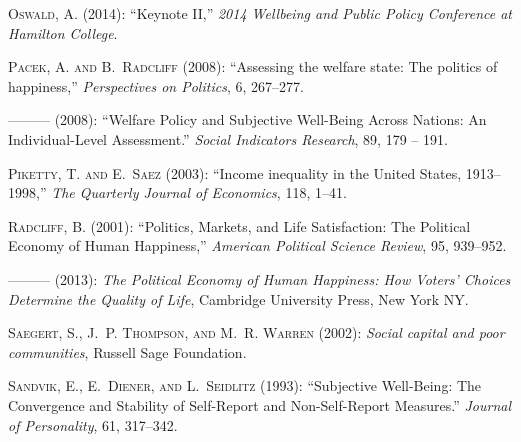 \documentclass[10pt, letterpaper]{article}
\begin{document}
\begin{spacing}{1.4}
\begin{spacing}{.9}
\begin{thebibliography}{71}
\textsc{Oswald, A.} (2014): \enquote{Keynote II,} \emph{2014 Wellbeing and
  Public Policy Conference at Hamilton College}.

\textsc{Pacek, A. and B.~Radcliff} (2008{}): \enquote{Assessing the
  welfare state: The politics of happiness,} \emph{Perspectives on Politics},
  6, 267--277.

---\hspace{-.1pt}---\hspace{-.1pt}--- (2008{}): \enquote{Welfare
  Policy and Subjective Well-Being Across Nations: An Individual-Level
  Assessment.} \emph{Social Indicators Research}, 89, 179 -- 191.

\textsc{Piketty, T. and E.~Saez} (2003): \enquote{Income inequality in the
  United States, 1913--1998,} \emph{The Quarterly Journal of Economics}, 118,
  1--41.

\textsc{Radcliff, B.} (2001): \enquote{Politics, Markets, and Life
  Satisfaction: The Political Economy of Human Happiness,} \emph{American
  Political Science Review}, 95, 939--952.

---\hspace{-.1pt}---\hspace{-.1pt}--- (2013): \emph{The Political Economy of
  Human Happiness: How Voters' Choices Determine the Quality of Life},
  Cambridge University Press, New York NY.

\textsc{Saegert, S., J.~P. Thompson, and M.~R. Warren} (2002): \emph{Social
  capital and poor communities}, Russell Sage Foundation.

\textsc{Sandvik, E., E.~Diener, and L.~Seidlitz} (1993): \enquote{Subjective
  Well-Being: The Convergence and Stability of Self-Report and Non-Self-Report
  Measures.} \emph{Journal of Personality}, 61, 317--342.


\end{thebibliography}
\end{spacing}
\end{spacing}
\end{document}
